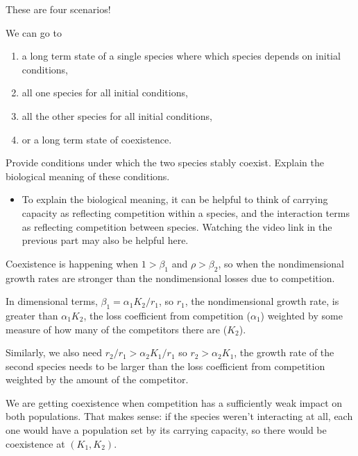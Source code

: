 \documentclass[12pt,letterpaper]{exam}
\begin{document}
\begin{questions}
\begin{parts}
\begin{solution}
These are four scenarios!

We can go to 
\begin{enumerate}
\item a long term state of a single species where which species depends on initial conditions,
\item all one species for all initial conditions, 
\item all the other species for all initial conditions,  
\item or a long term state of coexistence.
\end{enumerate}



\end{solution}

\item Provide conditions under which the two species stably coexist.  Explain the biological meaning of these conditions.  

\begin{itemize}
    \item To explain the biological meaning, it can be helpful to think of carrying capacity as reflecting competition within a species, and the interaction terms as reflecting competition between species.  Watching the video link in the previous part may also be helpful here.
\end{itemize}

\begin{solution}

Coexistence is happening when $1 > \beta_1$ and $\rho > \beta_2$, so when the nondimensional growth rates are stronger than the nondimensional losses due to competition.  

In dimensional terms, $\beta_1 = \alpha_1 K_2/r_1$, so $r_1$, the nondimensional growth rate, is greater than $\alpha_1K_2$, the loss coefficient from competition ($\alpha_1$) weighted by some measure of how many of the competitors there are ($K_2$).

Similarly, we also need $r_2/r_1 > \alpha_2K_1/r_1$ so $r_2 > \alpha_2 K_1$, the growth rate of the second species needs to be larger than the loss coefficient from competition weighted by the amount of the competitor.

We are getting coexistence when competition has a sufficiently weak impact on both populations.  That makes sense: if the species weren't interacting at all, each one would have a population set by its carrying capacity, so there would be coexistence at $(K_1, K_2)$.


\end{solution}
\end{parts}
\end{questions}
\end{document}
